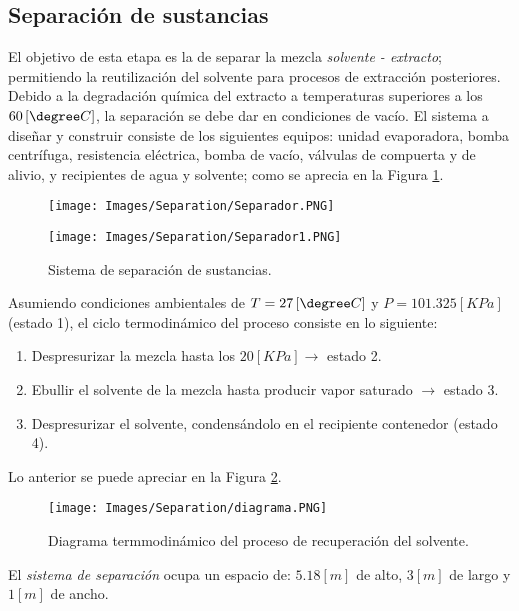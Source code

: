 \begin{center}
	\section{Separaci\'on de sustancias}
\end{center}

\noindent
\justify

El objetivo de esta etapa es la de separar la mezcla \textit{solvente - extracto}; permitiendo la reutilizaci\'on del solvente para procesos de extracci\'on posteriores. Debido a la degradaci\'on qu\'imica del extracto a temperaturas superiores a los $60 \left[ \degree C \right]$, la separaci\'on se debe dar en condiciones de vac\'io. El sistema a dise\~nar y construir consiste de los siguientes equipos: unidad evaporadora, bomba centr\'ifuga, resistencia el\'ectrica, bomba de vac\'io, v\'alvulas de compuerta y de alivio, y recipientes de agua y solvente; como se aprecia en la Figura \ref{sepa}.

\begin{figure}[h!]
\centering
\begin{minipage}[b]{0.48\textwidth}
	\texttt{[image: Images/Separation/Separador.PNG]}
\end{minipage}
\hfill
\begin{minipage}[b]{0.48\textwidth}
	\texttt{[image: Images/Separation/Separador1.PNG]}
\end{minipage}
\caption{Sistema de separaci\'on de sustancias.}
\label{sepa}

\end{figure}

\noindent
\justify

Asumiendo condiciones ambientales de $T = 27 \left[ \degree C \right]$ y $P = 101.325 [KPa]$ (estado 1), el ciclo termodin\'amico del proceso consiste en lo siguiente: 

\begin{enumerate}
	\item Despresurizar la mezcla hasta los $20 [KPa] \rightarrow$ estado 2.
	\item Ebullir el solvente de la mezcla hasta producir vapor saturado $\rightarrow$ estado 3.
	\item Despresurizar el solvente, condens\'andolo en el recipiente contenedor (estado 4).
\end{enumerate}

\newpage

\noindent
\justify

Lo anterior se puede apreciar en la Figura \ref{termo}.

\begin{figure}[h!]
	\centering
	\texttt{[image: Images/Separation/diagrama.PNG]}
	\caption{Diagrama termmodin\'amico del proceso de recuperaci\'on del solvente.}
	\label{termo}
\end{figure}

\noindent
\justify

El \textit{sistema de separaci\'on} ocupa un espacio de: $5.18 [m]$ de alto, $3 [m]$ de largo y $1 [m]$ de ancho. 